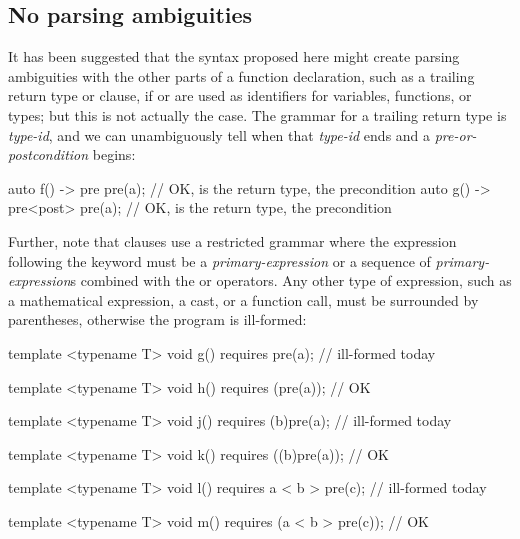
\subsection{No parsing ambiguities}
\label{subsec:noambig}

It has been suggested that the syntax proposed here might create parsing ambiguities with the other parts of a function declaration, such as a trailing return type or  clause, if  or  are used as identifiers for variables, functions, or types; but this is not actually the case. The grammar for a trailing return type is \tcode{->} \emph{type-id}, and we can unambiguously tell when that \emph{type-id} ends and a \emph{pre-or-postcondition} begins:

\vspace{2mm}
\begin{codeblock}
auto f() -> pre pre(a);   // OK,  is the return type,  the precondition
auto g() -> pre<post> pre(a);  // OK,  is the return type,  the precondition
\end{codeblock}
\vspace{2mm}

Further, note that  clauses use a restricted grammar where the expression following the  keyword must be a \emph{primary-expression} or a sequence of \emph{primary-expression}s combined with the \tcode{\&\&} or \tcode{||} operators. Any other type of expression, such as a mathematical expression, a cast, or a function call, must be surrounded by parentheses, otherwise the program is ill-formed:

\vspace{2mm}
\begin{codeblock}
template <typename T>
void g() requires pre(a);   // ill-formed today

template <typename T>
void h() requires (pre(a));   // OK

template <typename T>
void j() requires (b)pre(a);   // ill-formed today

template <typename T>
void k() requires ((b)pre(a));   // OK

template <typename T>
void l() requires a < b > pre(c);   // ill-formed today

template <typename T>
void m() requires (a < b > pre(c));   // OK

\end{codeblock}
\vspace{2mm}

